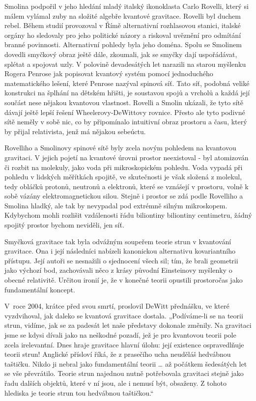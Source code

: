   Smolina podpořil v jeho hledání mladý italský ikonoklasta Carlo Rovelli, který si málem vylámal
  zuby na složité algebře kvantové gravitace. Rovelli byl duchem rebel. Během studií provozoval v
  Římě alternativní rozhlasovou stanici, italské orgány ho sledovaly pro jeho politické názory a
  riskoval uvěznění pro odmítání branné povinnosti. Alternativní pohledy byla jeho doména. Spolu se
  Smolinem dovedli smyčkový obraz ještě dále, zkoumali, jak se smyčky dají uspořádávat, splétat a
  spojovat uzly. V polovině devadesátých let narazili na starou myšlenku Rogera Penrose jak
  popisovat kvantový systém pomocí jednoduchého matematického lešení, které Penrose nazýval spinová
  síť. Tato síť, podobná veliké konstrukci na šplhání na dětském hřišti, je soustavou spojů a
  vrcholů a každá její součást nese nějakou kvantovou vlastnost. Rovelli a Smolin ukázali, že tyto
  sítě dávají ještě lepší řešení Wheelerovy-DeWittovy rovnice. Přesto ale tyto podivné sítě neměly v
  sobě nic, co by připomínalo intuitivní obraz prostoru a času, který by přijal relativista, jenž má
  nějakou sebeúctu. 
  
  Rovelliho a Smolinovy spinové sítě byly zcela novým pohledem na kvantovou gravitaci. V jejich
  pojetí na kvantové úrovni prostor neexistoval - byl atomizován či rozbit na molekuly, jako voda
  při mikroskopickém pohledu. Voda vypadá při pohledu v lidských měřítkách spojitě, ve skutečnosti
  je však složená z molekul, tedy obláčků protonů, neutronů a elektronů, které se vznášejí v
  prostoru, volně k sobě vázány elektromagnetickou silou. Stejně i prostor se zdá podle Rovelliho a
  Smolina hladký, ale tak by nevypadal pod extrémně silným mikroskopem. Kdybychom mohli rozlišit
  vzdálenosti řádu biliontiny biliontiny centimetru, žádný spojitý prostor bychom neviděli, jen síť.
  
  Smyčková gravitace tak byla odvážným soupeřem teorie strun v kvantování gravitace. Ona i její
  následníci nabízeli kanonickou alternativu kovariantního přístupu. Její autoři se nesnažili o
  sjednocení všech sil; tím, že brali geometrii jako výchozí bod, zachovávali něco z krásy původní
  Einsteinovy myšlenky o obecné relativitě. Určitou ironií je, že v konečné teorii opustili
  prostoročas jako fundamentální koncept. 
  
  V roce 2004, krátce před svou smrtí, proslovil DeWitt přednášku, ve které vyzdvihoval, jak daleko
  se kvantová gravitace dostala. „Podíváme-li se na teorii strun, vidíme, jak se za padesát let naše
  představy dokonale změnily. Na gravitaci jsme se kdysi dívali jako na neškodné pozadí, jež je pro
  kvantovou teorii pole zcela irelevantní. Dnes hraje gravitace hlavní úlohu: její existence
  ospravedlňuje teorii strun! Anglické přísloví říká, že z prasečího ucha neuděláš hedvábnou
  taštičku. Nikdo ji nebral jako fundamentální teorii … až počátkem šedesátých let se vše
  převrátilo. Teorie strun najednou nutně potřebovala gravitaci stejně jako řadu dalších objektů,
  které v ní jsou, ale i nemusí být, obsaženy. Z tohoto hlediska je teorie strun tou hedvábnou
  taštičkou.“
  

